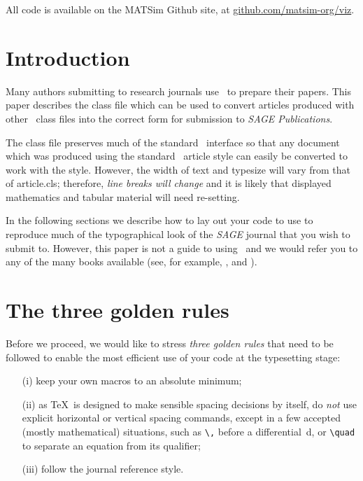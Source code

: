 \documentclass[Afour,sagev,times]{sagej}
\begin{document}
All code is available on the MATSim Github site, at \url{github.com/matsim-org/viz}.




\section{Introduction}
Many authors submitting to research journals use \LaTeXe\ to
prepare their papers. This paper describes the
\textsf{\journalclass} class file which can be used to convert
articles produced with other \LaTeXe\ class files into the correct
form for submission to \textit{SAGE Publications}.

The \textsf{\journalclass} class file preserves much of the
standard \LaTeXe\ interface so that any document which was
produced using the standard \LaTeXe\ \textsf{article} style can
easily be converted to work with the \textsf{\journalclassshort}
style. However, the width of text and typesize will vary from that
of \textsf{article.cls}; therefore, \textit{line breaks will change}
and it is likely that displayed mathematics and tabular material
will need re-setting.

In the following sections we describe how to lay out your code to
use \textsf{\journalclass} to reproduce much of the typographical look of
the \textit{SAGE} journal that you wish to submit to. However, this paper is not a guide to
using \LaTeXe\ and we would refer you to any of the many books
available (see, for example, \cite{R1}, \cite{R2} and \cite{R3}).

\section{The three golden rules}
Before we proceed, we would like to stress \textit{three golden
rules} that need to be followed to enable the most efficient use
of your code at the typesetting stage:
\begin{enumerate}
\item[(i)] keep your own macros to an absolute minimum;

\item[(ii)] as \TeX\ is designed to make sensible spacing
decisions by itself, do \textit{not} use explicit horizontal or
vertical spacing commands, except in a few accepted (mostly
mathematical) situations, such as \verb"\," before a
differential~d, or \verb"\quad" to separate an equation from its
qualifier;

\item[(iii)] follow the journal reference style.
\end{enumerate}
\end{document}
